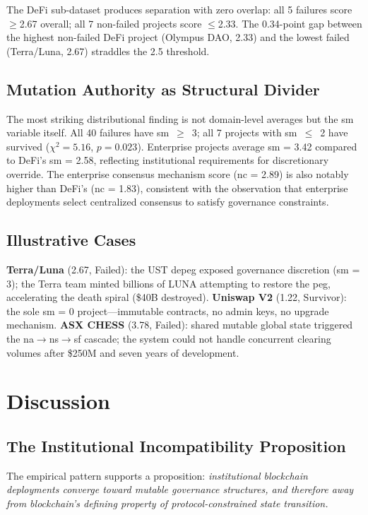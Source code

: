 \documentclass[conference]{IEEEtran}
\begin{document}
The DeFi sub-dataset produces separation with zero overlap: all 5 failures score $\geq$2.67 overall; all 7 non-failed projects score $\leq$2.33. The 0.34-point gap between the highest non-failed DeFi project (Olympus DAO, 2.33) and the lowest failed (Terra/Luna, 2.67) straddles the 2.5 threshold.

\subsection{Mutation Authority as Structural Divider}

The most striking distributional finding is not domain-level averages but the sm variable itself. All 40 failures have sm~$\geq$~3; all 7 projects with sm~$\leq$~2 have survived ($\chi^2 = 5.16$, $p = 0.023$). Enterprise projects average sm = 3.42 compared to DeFi's sm = 2.58, reflecting institutional requirements for discretionary override. The enterprise consensus mechanism score (nc = 2.89) is also notably higher than DeFi's (nc = 1.83), consistent with the observation that enterprise deployments select centralized consensus to satisfy governance constraints.

\subsection{Illustrative Cases}

\textbf{Terra/Luna} (2.67, Failed): the UST depeg exposed governance discretion (sm = 3); the Terra team minted billions of LUNA attempting to restore the peg, accelerating the death spiral (\$40B destroyed). \textbf{Uniswap V2} (1.22, Survivor): the sole sm = 0 project---immutable contracts, no admin keys, no upgrade mechanism. \textbf{ASX CHESS} (3.78, Failed): shared mutable global state triggered the na$\rightarrow$ns$\rightarrow$sf cascade; the system could not handle concurrent clearing volumes after \$250M and seven years of development.

\section{Discussion}

\subsection{The Institutional Incompatibility Proposition}

The empirical pattern supports a proposition: \textit{institutional blockchain deployments converge toward mutable governance structures, and therefore away from blockchain's defining property of protocol-constrained state transition.}
\end{document}
